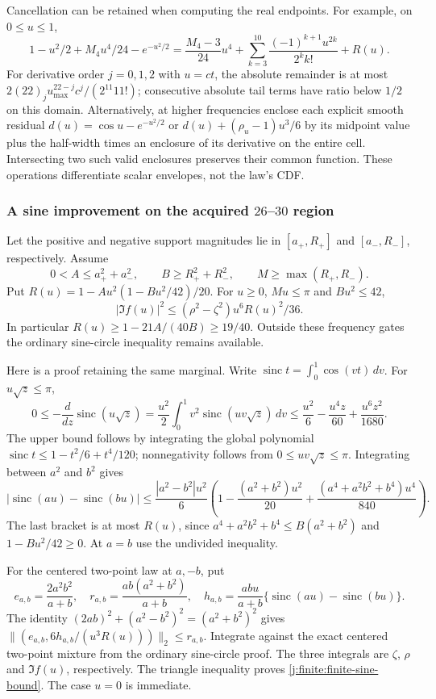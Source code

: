Cancellation can be retained when computing the real endpoints.
For example, on $0\le u\le1$,
\[
 1-u^2/2+M_4u^4/24-e^{-u^2/2}
 =\frac{M_4-3}{24}u^4
   +\sum_{k=3}^{10}\frac{(-1)^{k+1}u^{2k}}{2^kk!}+R(u).
\]
For derivative order $j=0,1,2$ with $u=ct$, the absolute remainder
is at most $2(22)_j u_{\max}^{22-j}c^j/(2^{11}11!)$; consecutive
absolute tail terms have ratio below $1/2$ on this domain.
Alternatively, at higher frequencies enclose each explicit smooth
residual $d(u)=\cos u-e^{-u^2/2}$ or
$d(u)+(\rho_u-1)u^3/6$ by its midpoint value plus the half-width
times an enclosure of its derivative on the entire cell.
Intersecting two such valid enclosures preserves their common function.
These operations differentiate scalar envelopes, not the law's CDF.


\subsubsection{A sine improvement on the acquired $26$--$30$ region}
\label{j:finite:finite-sine}
Let the positive and negative support magnitudes lie in
$[a_+,R_+]$ and $[a_-,R_-]$, respectively. Assume
\[
 0<A\le a_+^2+a_-^2,\qquad
 B\ge R_+^2+R_-^2,\qquad M\ge\max(R_+,R_-).
\]
Put $R(u)=1-Au^2(1-Bu^2/42)/20$.
For $u\ge0$, $Mu\le\pi$ and $Bu^2\le42$,
\begin{equation}\label{j:finite:finite-sine-bound}
 |\Im f(u)|^2\le(\rho^2-\zeta^2)u^6R(u)^2/36.
\end{equation}
In particular $R(u)\ge1-21A/(40B)\ge19/40$.
Outside these frequency gates the ordinary sine-circle inequality
remains available.

Here is a proof retaining the same marginal. Write
$\operatorname{sinc}t=\int_0^1\cos(vt)\,dv$. For $u\sqrt z\le\pi$,
\[
 0\le-\frac{d}{dz}\operatorname{sinc}(u\sqrt z)
 =\frac{u^2}{2}\int_0^1v^2\operatorname{sinc}(uv\sqrt z)\,dv
 \le\frac{u^2}6-\frac{u^4z}{60}+\frac{u^6z^2}{1680}.
\]
The upper bound follows by integrating the global polynomial
$\operatorname{sinc}t\le1-t^2/6+t^4/120$; nonnegativity follows
from $0\le uv\sqrt z\le\pi$.
Integrating between $a^2$ and $b^2$ gives
\[
 |\operatorname{sinc}(au)-\operatorname{sinc}(bu)|
 \le\frac{|a^2-b^2|u^2}{6}
 \left(1-\frac{(a^2+b^2)u^2}{20}
       +\frac{(a^4+a^2b^2+b^4)u^4}{840}\right).
\]
The last bracket is at most $R(u)$, since
$a^4+a^2b^2+b^4\le B(a^2+b^2)$ and
$1-Bu^2/42\ge0$. At $a=b$ use the undivided inequality.

For the centered two-point law at $a,-b$, put
\[
 e_{a,b}=\frac{2a^2b^2}{a+b},\quad
 r_{a,b}=\frac{ab(a^2+b^2)}{a+b},\quad
 h_{a,b}=\frac{abu}{a+b}
       \{\operatorname{sinc}(au)-\operatorname{sinc}(bu)\}.
\]
The identity $(2ab)^2+(a^2-b^2)^2=(a^2+b^2)^2$ gives
$\|(e_{a,b},6h_{a,b}/(u^3R(u)))\|_2\le r_{a,b}$.
Integrate against the exact centered two-point mixture from the
ordinary sine-circle proof. The three integrals are $\zeta$, $\rho$
and $\Im f(u)$, respectively. The triangle inequality proves
\eqref{j:finite:finite-sine-bound}. The case $u=0$ is immediate.

